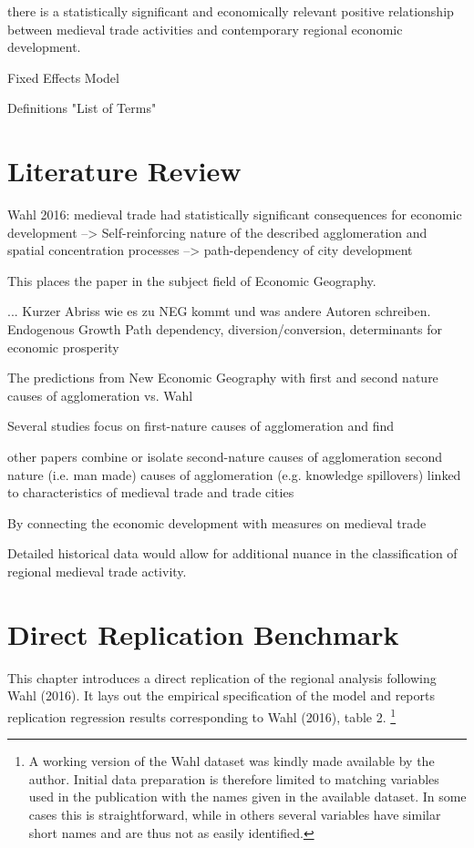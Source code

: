 \documentclass[
12pt, %
english, %
onehalfspacing, %
oneside,
headsepline, %
openany
]{MastersDoctoralThesis} %
\begin{document}
there is a statistically significant and economically relevant positive relationship between medieval trade activities and contemporary regional economic development.

Fixed Effects Model

Definitions "List of Terms"

\newpage

\chapter{Literature Review}

Wahl 2016: medieval trade had statistically significant consequences for economic development --> Self-reinforcing nature of the described agglomeration and spatial concentration processes
--> path-dependency of city development

This places the paper in the subject field of Economic Geography. 

... Kurzer Abriss wie es zu NEG kommt und was andere Autoren schreiben. Endogenous Growth Path dependency, diversion/conversion, determinants for economic prosperity

The predictions from New Economic Geography with first and second nature causes of agglomeration vs. Wahl 

Several studies focus on first-nature causes of agglomeration and find

other papers combine or isolate second-nature causes of agglomeration
second nature (i.e. man made) causes of agglomeration (e.g. knowledge spillovers) linked to characteristics of medieval trade and trade cities

By connecting the economic development with measures on medieval trade

Detailed historical data would allow for additional nuance in the classification of regional medieval trade activity. 



\newpage

\chapter{Direct Replication Benchmark}

This chapter introduces a direct replication of the regional analysis following Wahl (2016). It lays out the empirical specification of the model and reports replication regression results corresponding to Wahl (2016), table 2. \footnote{A working version of the Wahl dataset was kindly made available by the author. Initial data preparation is therefore limited to matching variables used in the publication with the names given in the available dataset. In some cases this is straightforward, while in others several variables have similar short names and are thus not as easily identified.}
\end{document}
